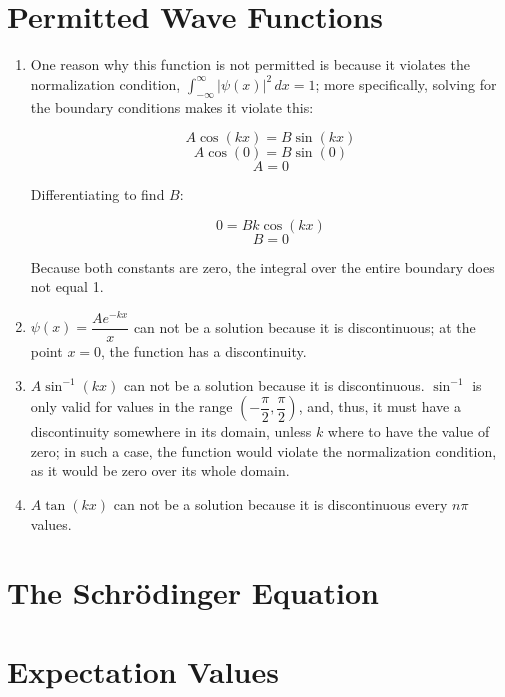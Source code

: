 \begin{enumerate}

    \section*{Permitted Wave Functions}

    \begin{enumerate}

      \item One reason why this function is not permitted is because it violates the normalization condition, $\displaystyle \int_{-\infty}^{\infty}|\psi(x)|^2\,dx=1$; more specifically, solving for the boundary conditions makes it violate this:

        $$A\cos(kx)=B\sin(kx)$$
        $$A\cos(0)=B\sin(0)$$
        $$A=0$$

        Differentiating to find $B$:

        $$0=Bk\cos(kx)$$
        $$B=0$$

        Because both constants are zero, the integral over the entire boundary does not equal 1.

      \item $\psi(x)=\dfrac{Ae^{-kx}}{x}$ can not be a solution because it is discontinuous; at the point $x=0$, the function has a discontinuity.

      \item $A\sin^{-1}(kx)$ can not be a solution because it is discontinuous. $\sin^{-1}$ is only valid for values in the range $\left(-\dfrac{\pi}{2}, \dfrac{\pi}{2}\right)$, and, thus, it must have a discontinuity somewhere in its domain, unless $k$ where to have the value of zero; in such a case, the function would violate the normalization condition, as it would be zero over its whole domain.

      \item $A\tan(kx)$ can not be a solution because it is discontinuous every $n\pi$ values.

    \end{enumerate}

    \section*{The Schr\"odinger Equation}

    \section*{Expectation Values}


\end{enumerate}
